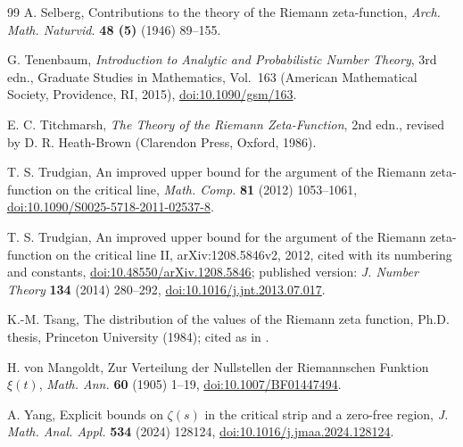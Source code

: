 \documentclass[11pt,a4paper]{article}
\makeatletter
\numberwithin{equation}{section}
\DeclareRobustCommand{\CGcite}[2][]{\if\relax\detokenize{#1}\relax\cite{#2}\else\cite[#1]{#2}\fi}
\newcommand{\CG@getbib}[1]{\@ifundefined{CGBib@#1}{#1}{\csname CGBib@#1\endcsname}}
\DeclareRobustCommand{\CGcite}[2][]{\pdftooltip{\if\relax\detokenize{#1}\relax\cite{#2}\else\cite[#1]{#2}\fi}{\CG@getbib{#2}}}
\theoremstyle{definition}
\theoremstyle{remark}
\makeatother
\begin{document}
\begin{thebibliography}{99}
 A. Selberg, Contributions to the theory of the Riemann zeta-function, \textit{Arch. Math. Naturvid.} \textbf{48 (5)} (1946) 89--155.

 G. Tenenbaum, \textit{Introduction to Analytic and Probabilistic Number Theory}, 3rd edn., Graduate Studies in Mathematics, Vol.~163 (American Mathematical Society, Providence, RI, 2015), \href{https://doi.org/10.1090/gsm/163}{doi:10.1090/gsm/163}.

 E. C. Titchmarsh, \textit{The Theory of the Riemann Zeta-Function}, 2nd edn., revised by D. R. Heath-Brown (Clarendon Press, Oxford, 1986).

 T. S. Trudgian, An improved upper bound for the argument of the Riemann zeta-function on the critical line, \textit{Math. Comp.} \textbf{81} (2012) 1053--1061, \href{https://doi.org/10.1090/S0025-5718-2011-02537-8}{doi:10.1090/S0025-5718-2011-02537-8}.

 T. S. Trudgian, An improved upper bound for the argument of the Riemann zeta-function on the critical line II, arXiv:1208.5846v2, 2012, cited with its numbering and constants, \href{https://doi.org/10.48550/arXiv.1208.5846}{doi:10.48550/arXiv.1208.5846}; published version: \textit{J. Number Theory} \textbf{134} (2014) 280--292, \href{https://doi.org/10.1016/j.jnt.2013.07.017}{doi:10.1016/j.jnt.2013.07.017}.

 K.-M. Tsang, The distribution of the values of the Riemann zeta function, Ph.D. thesis, Princeton University (1984); cited as in \CGcite[\S3]{FazzariGerspachMinelli2025}.

 H. von Mangoldt, Zur Verteilung der Nullstellen der Riemannschen Funktion $\xi(t)$, \textit{Math. Ann.} \textbf{60} (1905) 1--19, \href{https://doi.org/10.1007/BF01447494}{doi:10.1007/BF01447494}.

 A. Yang, Explicit bounds on $\zeta(s)$ in the critical strip and a zero-free region, \textit{J. Math. Anal. Appl.} \textbf{534} (2024) 128124, \href{https://doi.org/10.1016/j.jmaa.2024.128124}{doi:10.1016/j.jmaa.2024.128124}.

\end{thebibliography}
\end{document}
